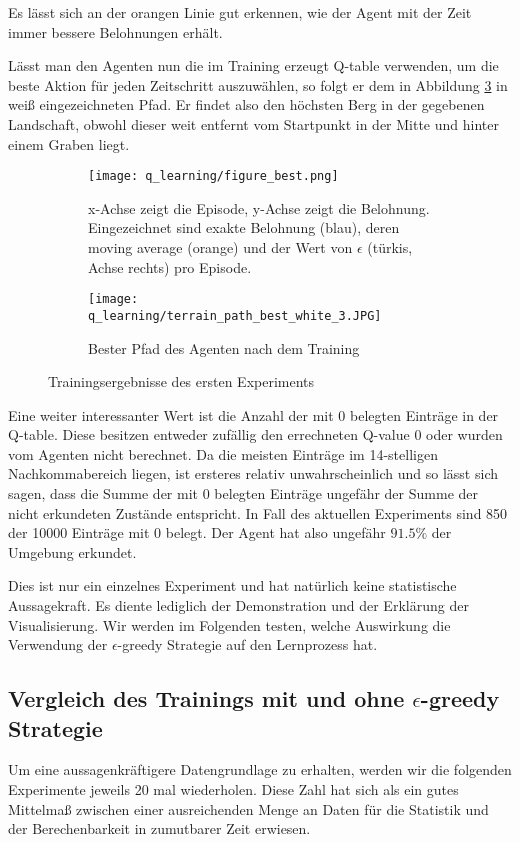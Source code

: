 Es lässt sich an der orangen Linie gut erkennen, wie der Agent mit der Zeit immer bessere Belohnungen erhält.

Lässt man den Agenten nun die im Training erzeugt Q-table verwenden, um die beste Aktion für jeden Zeitschritt auszuwählen, so folgt er dem in Abbildung \ref{img:pathQBest} in weiß eingezeichneten Pfad. Er findet also den höchsten Berg in der gegebenen Landschaft, obwohl dieser weit entfernt vom Startpunkt in der Mitte und hinter einem Graben liegt.

\begin{figure}[h!]
    \centering
    \begin{subfigure}[b]{0.49\textwidth}
        \texttt{[image: q\_learning/figure\_best.png]}
        \caption{x-Achse zeigt die Episode, y-Achse zeigt die Belohnung. Eingezeichnet sind exakte Belohnung (blau), deren moving average (orange) und der Wert von $ \epsilon $ (türkis, Achse rechts) pro Episode.}
        \label{img:graphQBest}
    \end{subfigure}
    \begin{subfigure}[b]{0.49\textwidth}
        \texttt{[image: q\_learning/terrain\_path\_best\_white\_3.JPG]}
        \caption{Bester Pfad des Agenten nach dem Training}
        \label{img:pathQBest}
    \end{subfigure}
    \caption{Trainingsergebnisse des ersten Experiments}
\end{figure}

Eine weiter interessanter Wert ist die Anzahl der mit 0 belegten Einträge in der Q-table. Diese besitzen entweder zufällig den errechneten Q-value 0 oder wurden vom Agenten nicht berechnet. Da die meisten Einträge im 14-stelligen Nachkommabereich liegen, ist ersteres relativ unwahrscheinlich und so lässt sich sagen, dass die Summe der mit 0 belegten Einträge ungefähr der Summe der nicht erkundeten Zustände entspricht. In Fall des aktuellen Experiments sind 850 der 10000 Einträge mit 0 belegt. Der Agent hat also ungefähr $ 91.5\% $ der Umgebung erkundet.

Dies ist nur ein einzelnes Experiment und hat natürlich keine statistische Aussagekraft. Es diente lediglich der Demonstration und der Erklärung der Visualisierung. Wir werden im Folgenden testen, welche Auswirkung die Verwendung der $ \epsilon $-greedy Strategie auf den Lernprozess hat.

\subsection{Vergleich des Trainings mit und ohne $ \epsilon $-greedy Strategie}
Um eine aussagenkräftigere Datengrundlage zu erhalten, werden wir die folgenden Experimente jeweils 20 mal wiederholen. Diese Zahl hat sich als ein gutes Mittelmaß zwischen einer ausreichenden Menge an Daten für die Statistik und der Berechenbarkeit in zumutbarer Zeit erwiesen.

